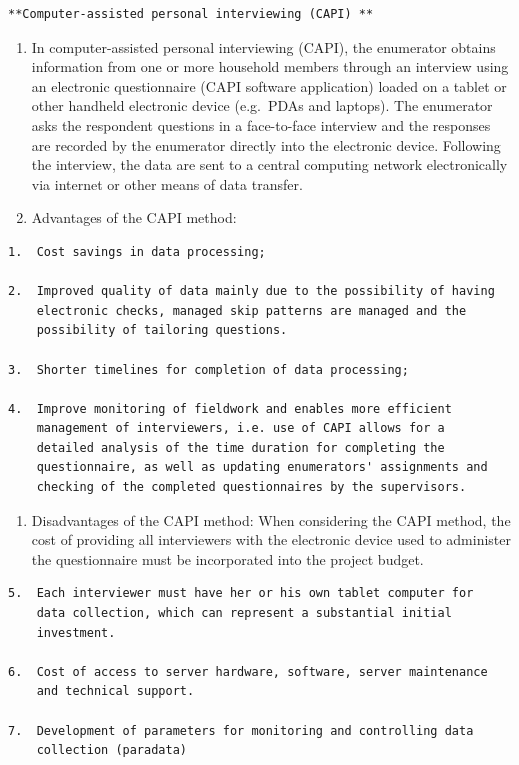 \documentclass[
]{article}
\providecommand{\tightlist}{%
  \setlength{\itemsep}{0pt}\setlength{\parskip}{0pt}}
\begin{document}
\begin{verbatim}
**Computer-assisted personal interviewing (CAPI) **
\end{verbatim}

\begin{enumerate}
\def\labelenumi{\arabic{enumi}.}
\setcounter{enumi}{301}
\item
  In computer-assisted personal interviewing (CAPI), the enumerator
  obtains information from one or more household members through an
  interview using an electronic questionnaire (CAPI software
  application) loaded on a tablet or other handheld electronic device
  (e.g.~PDAs and laptops). The enumerator asks the respondent
  questions in a face-to-face interview and the responses are recorded
  by the enumerator directly into the electronic device. Following the
  interview, the data are sent to a central computing network
  electronically via internet or other means of data transfer.
\item
  Advantages of the CAPI method:
\end{enumerate}

\begin{verbatim}
1.  Cost savings in data processing;

2.  Improved quality of data mainly due to the possibility of having
    electronic checks, managed skip patterns are managed and the
    possibility of tailoring questions.

3.  Shorter timelines for completion of data processing;

4.  Improve monitoring of fieldwork and enables more efficient
    management of interviewers, i.e. use of CAPI allows for a
    detailed analysis of the time duration for completing the
    questionnaire, as well as updating enumerators' assignments and
    checking of the completed questionnaires by the supervisors.
\end{verbatim}

\begin{enumerate}
\def\labelenumi{\arabic{enumi}.}
\setcounter{enumi}{303}
\tightlist
\item
  Disadvantages of the CAPI method: When considering the CAPI method,
  the cost of providing all interviewers with the electronic device
  used to administer the questionnaire must be incorporated into the
  project budget.
\end{enumerate}

\begin{verbatim}
5.  Each interviewer must have her or his own tablet computer for
    data collection, which can represent a substantial initial
    investment.

6.  Cost of access to server hardware, software, server maintenance
    and technical support.

7.  Development of parameters for monitoring and controlling data
    collection (paradata)
\end{verbatim}
\end{document}

